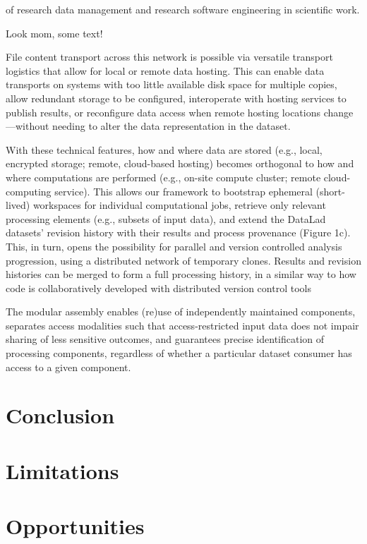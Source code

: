 of research data management and research software engineering in scientific work.


Look mom, some text!



File content transport across this network is possible via versatile transport logistics that allow for local or remote data hosting. This can enable data transports on systems with too little available disk space for multiple copies, allow redundant storage to be configured, interoperate with hosting services to publish results, or reconfigure data access when remote hosting locations change—without needing to alter the data representation in the dataset.

With these technical features, how and where data are stored (e.g., local, encrypted storage; remote, cloud-based hosting) becomes orthogonal to how and where computations are performed (e.g., on-site compute cluster; remote cloud-computing service). This allows our framework to bootstrap ephemeral (short-lived) workspaces for individual computational jobs, retrieve only relevant processing elements (e.g., subsets of input data), and extend the DataLad datasets’ revision history with their results and process provenance (Figure 1c). This, in turn, opens the possibility for parallel and version controlled analysis progression, using a distributed network of temporary clones. Results and revision histories can be merged to form a full processing history, in a similar way to how code is collaboratively developed with distributed version control tools




The modular assembly enables (re)use of independently maintained components, separates access modalities such that access-restricted input data does not impair sharing of less sensitive outcomes, and guarantees precise identification of processing components, regardless of whether a particular dataset consumer has access to a given component.




\section{Conclusion}

\section{Limitations}


\section{Opportunities}


